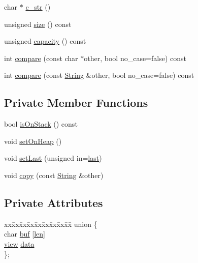 \begin{DoxyCompactItemize}
\item 
char $\ast$ \hyperlink{classdoctest_1_1String_a35df67f11652bcc568ad3af470c344c0}{c\+\_\+str} ()
\item 
unsigned \hyperlink{classdoctest_1_1String_a9fbc7b09f1660b236f12fc2adce6183d}{size} () const
\item 
unsigned \hyperlink{classdoctest_1_1String_adad8703f08950d173d2cb1426391fcdf}{capacity} () const
\item 
int \hyperlink{classdoctest_1_1String_aef87d1f106d32d8c31af87335b44164d}{compare} (const char $\ast$other, bool no\+\_\+case=false) const
\item 
int \hyperlink{classdoctest_1_1String_adb57becb56e054d981e7c2b967a7e359}{compare} (const \hyperlink{classdoctest_1_1String}{String} \&other, bool no\+\_\+case=false) const
\end{DoxyCompactItemize}
\subsection*{Private Member Functions}
\begin{DoxyCompactItemize}
\item 
bool \hyperlink{classdoctest_1_1String_abdd2799b06103994c5ac26fa9715849d}{is\+On\+Stack} () const
\item 
void \hyperlink{classdoctest_1_1String_acd24518770a530bbfd6cd21297ada407}{set\+On\+Heap} ()
\item 
void \hyperlink{classdoctest_1_1String_a801d3d8ba364be7e05f0e27447521b8b}{set\+Last} (unsigned in=\hyperlink{classdoctest_1_1String_a7e34a25b9fed27da2b69f75449ca510c}{last})
\item 
void \hyperlink{classdoctest_1_1String_a9adde1fae310e0d1a394cc1383495572}{copy} (const \hyperlink{classdoctest_1_1String}{String} \&other)
\end{DoxyCompactItemize}
\subsection*{Private Attributes}
\begin{DoxyCompactItemize}
\item 
\begin{tabbing}
xx\=xx\=xx\=xx\=xx\=xx\=xx\=xx\=xx\=\kill
union \{\\
\>char \hyperlink{classdoctest_1_1String_a7e031ced488588936a540eba26facf67}{buf} \mbox{[}\hyperlink{classdoctest_1_1String_a1025b38e7785f5541af920a237b744db}{len}\mbox{]}\\
\>\hyperlink{structdoctest_1_1String_1_1view}{view} \hyperlink{classdoctest_1_1String_a5c77ed634a1b81aea739a73fb01d986a}{data}\\
\}; \\

\end{tabbing}\end{DoxyCompactItemize}
